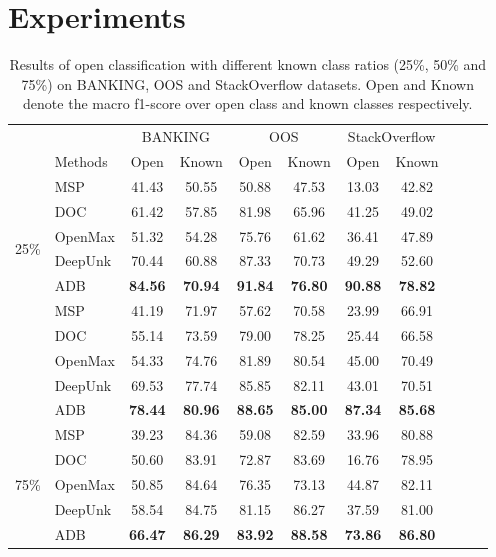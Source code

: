 \documentclass[letterpaper]{article} %
\begin{document}
\section{Experiments}
\begin{table}[!t]\small
\centering
\begin{tabular}{@{\extracolsep{15pt}}clccccccccc}
\toprule
\centering
&  & \multicolumn{2}{c}{BANKING} & \multicolumn{2}{c}{OOS} & \multicolumn{2}{c}{StackOverflow} \\
\addlinespace[0.1cm]  \cline{3-4} \cline{5-6} \cline{7-8}  \addlinespace[0.1cm]
& Methods &  Open & Known & Open  & Known  & Open & Known\\
\midrule
\multirow{6}{*}[1ex]{25\%}
& MSP & 41.43 & 50.55 & 50.88 & 47.53   & 13.03 & 42.82 \\
& DOC & 61.42 & 57.85  & 81.98 & 65.96  & 41.25 & 49.02 \\
& OpenMax & 51.32 & 54.28  & 75.76 & 61.62  & 36.41 & 47.89 \\
& DeepUnk & 70.44 & 60.88 & 87.33 & 70.73  & 49.29 & 52.60  \\
& ADB  & \textbf{84.56} & \textbf{70.94}  & \textbf{91.84} & \textbf{76.80}  & \textbf{90.88} & \textbf{78.82} \\
\midrule
\midrule
\multirow{6}{*}[1ex]{50\%}
& MSP & 41.19 & 71.97 & 57.62 & 70.58 & 23.99 & 66.91 \\
& DOC & 55.14 & 73.59 & 79.00 & 78.25   & 25.44 & 66.58 \\
& OpenMax & 54.33 & 74.76 & 81.89 & 80.54  & 45.00 & 70.49 \\
& DeepUnk & 69.53 & 77.74  & 85.85 & 82.11  & 43.01 & 70.51  \\
& ADB &\textbf{78.44}	&\textbf{80.96}		&\textbf{88.65}	&\textbf{85.00}		&\textbf{87.34}	&\textbf{85.68}	\\
\midrule
\midrule
\multirow{6}{*}[1ex]{ 75\%}
& MSP & 39.23 & 84.36  & 59.08 & 82.59   & 33.96 & 80.88 \\
& DOC & 50.60 & 83.91  & 72.87 & 83.69  & 16.76 & 78.95 \\
& OpenMax & 50.85 & 84.64 & 76.35 & 73.13   & 44.87 & 82.11 \\
& DeepUnk & 58.54 & 84.75  & 81.15 & 86.27  & 37.59 & 81.00 \\
& ADB &\textbf{66.47}	&\textbf{86.29}		&\textbf{83.92}	&\textbf{88.58}	 &\textbf{73.86}	&\textbf{86.80}	\\
\bottomrule
\end{tabular}
\caption{ \label{results-main-2}
Results of open classification with different known class ratios (25\%, 50\% and 75\%) on BANKING, OOS and StackOverflow datasets. Open and Known denote the macro f1-score over open class and known classes respectively.
}
\end{table}
\end{document}

